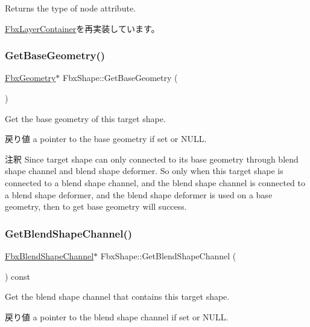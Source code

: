 Returns the type of node attribute. 

\hyperlink{class_fbx_layer_container_a578a24bfcd49464813a4b5b08a12ec59}{Fbx\+Layer\+Container}を再実装しています。

\mbox{\label{class_fbx_shape_ad011e68be3532c1e16c9871f7b31d8b4}} 
\subsubsection{\texorpdfstring{Get\+Base\+Geometry()}{GetBaseGeometry()}}
{\footnotesize\ttfamily \hyperlink{class_fbx_geometry}{Fbx\+Geometry}$\ast$ Fbx\+Shape\+::\+Get\+Base\+Geometry (\begin{DoxyParamCaption}{ }\end{DoxyParamCaption})}

Get the base geometry of this target shape. \begin{DoxyReturn}{戻り値}
a pointer to the base geometry if set or N\+U\+LL. 
\end{DoxyReturn}
\begin{DoxyRemark}{注釈}
Since target shape can only connected to its base geometry through blend shape channel and blend shape deformer. So only when this target shape is connected to a blend shape channel, and the blend shape channel is connected to a blend shape deformer, and the blend shape deformer is used on a base geometry, then to get base geometry will success. 
\end{DoxyRemark}
\mbox{\label{class_fbx_shape_a311a362cbfde68630794a7fb20cff9ee}} 
\subsubsection{\texorpdfstring{Get\+Blend\+Shape\+Channel()}{GetBlendShapeChannel()}}
{\footnotesize\ttfamily \hyperlink{class_fbx_blend_shape_channel}{Fbx\+Blend\+Shape\+Channel}$\ast$ Fbx\+Shape\+::\+Get\+Blend\+Shape\+Channel (\begin{DoxyParamCaption}{ }\end{DoxyParamCaption}) const}

Get the blend shape channel that contains this target shape. \begin{DoxyReturn}{戻り値}
a pointer to the blend shape channel if set or N\+U\+LL. 
\end{DoxyReturn}
\mbox{\label{class_fbx_shape_ad32f3e5fef82478e0f5c5bdf499b8f28}} 
